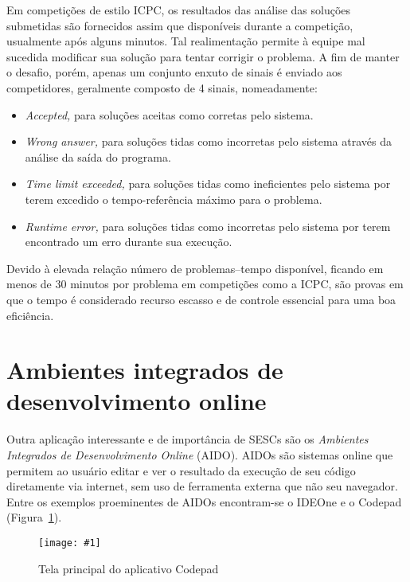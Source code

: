 \documentclass[ruledheader, 12pt]{abnt}
\newcommand{\figcustom}[4]{\par
	\begin{figure}[#3]
		\centering
		\texttt{[image: \#1]}
		\caption{\label{fig:#1}#2}
	\end{figure}
\par}
\newcommand{\fig}[2]{\figcustom{#1}{#2}{bp}{1}}
\newcommand{\figref}[1]{(Figura~\ref{fig:#1})}
\begin{document}
Em competições de estilo ICPC, os resultados das análise das soluções submetidas são fornecidos assim que disponíveis durante a competição, usualmente após alguns minutos. Tal realimentação permite à equipe mal sucedida modificar sua solução para tentar corrigir o problema. A fim de manter o desafio, porém, apenas um conjunto enxuto de sinais é enviado aos competidores, geralmente composto de 4 sinais, nomeadamente:
\begin{itemize}
	\item \emph{Accepted,} para soluções aceitas como corretas pelo sistema.
	\item \emph{Wrong answer,} para soluções tidas como incorretas pelo sistema através da análise da saída do programa.
	\item \emph{Time limit exceeded,} para soluções tidas como ineficientes pelo sistema por terem excedido o tempo-referência máximo para o problema.
	\item \emph{Runtime error,} para soluções tidas como incorretas pelo sistema por terem encontrado um erro durante sua execução.
\end{itemize}

Devido à elevada relação número de problemas--tempo disponível, ficando em menos de 30 minutos por problema em competições como a ICPC, são provas em que o tempo é considerado recurso escasso e de controle essencial para uma boa eficiência.

\section{Ambientes integrados de desenvolvimento online}


Outra aplicação interessante e de importância de SESCs são os \emph{Ambientes Integrados de Desenvolvimento Online} (AIDO). AIDOs são sistemas online que permitem ao usuário editar e ver o resultado da execução de seu código diretamente via internet, sem uso de ferramenta externa que não seu navegador. Entre os exemplos proeminentes de AIDOs encontram-se o IDEOne \cite{ideoneabout} e o Codepad \cite{codepadabout} \figref{codepad}.

\fig{codepad}{Tela principal do aplicativo Codepad}
\end{document}
